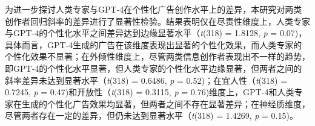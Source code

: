为进一步探讨人类专家与GPT-4在个性化广告创作水平上的差异，本研究对两类创作者回归斜率的差异进行了显著性检验。结果表明仅在尽责性维度上，人类专家与GPT-4的个性化水平之间差异达到边缘显著水平（\textit{t}(318) = 1.8128, \textit{p} = 0.07)，具体而言，GPT-4生成的广告在该维度表现出显著的个性化效果，而人类专家的个性化效果不显著；在外倾性维度上，尽管两类信息创作者表现出不一样的趋势，即GPT-4的个性化水平显著，但人类专家的个性化水平边缘显著，但两者之间的斜率差异未达到显著水平（\textit{t}(318) = 0.6486, \textit{p} = 0.52)；在宜人性（\textit{t}(318) = 0.7245, \textit{p} = 0.47)和开放性（\textit{t}(318) = 0.3115, \textit{p} = 0.76)维度上，GPT-4和人类专家在生成的个性化广告效果均显著，但两者之间不存在显著差异；在神经质维度，尽管两者存在一定的差异，但仍未达到显著水平（\textit{t}(318) = 1.4269, \textit{p} = 0.15)。

\FloatBarrier %

